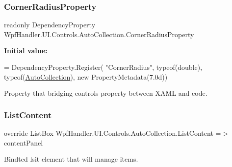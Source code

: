 \subsubsection{\texorpdfstring{Corner\+Radius\+Property}{CornerRadiusProperty}}
{\footnotesize\ttfamily readonly Dependency\+Property Wpf\+Handler.\+U\+I.\+Controls.\+Auto\+Collection.\+Corner\+Radius\+Property\hspace{0.3cm}{\ttfamily [static]}}

{\bfseries Initial value\+:}
\begin{DoxyCode}
= DependencyProperty.Register(
          \textcolor{stringliteral}{"CornerRadius"}, typeof(\textcolor{keywordtype}{double}), typeof(\mbox{\hyperlink{class_wpf_handler_1_1_u_i_1_1_controls_1_1_auto_collection_a8bc71a7c43dfeca1d6ff113b12088c28}{AutoCollection}}),
          \textcolor{keyword}{new} PropertyMetadata(7.0d))
\end{DoxyCode}


Property that bridging control\textquotesingle{}s property between X\+A\+ML and code. 

\mbox{\label{class_wpf_handler_1_1_u_i_1_1_controls_1_1_auto_collection_a144774a121d36e2207fd0e39dd67a074}} 
\subsubsection{\texorpdfstring{List\+Content}{ListContent}}
{\footnotesize\ttfamily override List\+Box Wpf\+Handler.\+U\+I.\+Controls.\+Auto\+Collection.\+List\+Content =$>$ content\+Panel}



Bindted lsit element that will manage items. 

\mbox{\label{class_wpf_handler_1_1_u_i_1_1_controls_1_1_auto_collection_a996c2d451bb6e072a9ff03ce6a21b5fc}} 
